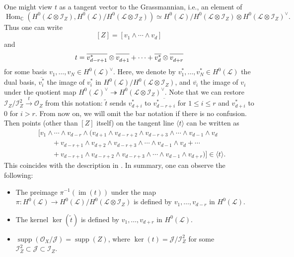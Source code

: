 \documentclass[a4paper]{amsart}
\numberwithin{equation}{section}
\theoremstyle{plain}
\theoremstyle{definition}
\theoremstyle{remark}
\numberwithin{figure}{section}
\numberwithin{table}{section}
\numberwithin{equation}{section}
\def \CC {\mathbb{C}}
\def \Ical {\mathcal{I}}
\def \Jcal {\mathcal{J}}
\def \Lcal {\mathcal{L}}
\def \Ocal {\mathcal{O}}
\DeclareMathOperator{\im}{im}
\DeclareMathOperator{\supp}{supp}
\DeclareMathOperator{\Hom}{Hom}
\begin{document}
One might view $t$ as a tangent vector to the Grassmannian, i.e., an element of
 \[
  \Hom_{\CC}(H^0(\Lcal \otimes \Ical_Z), H^0(\Lcal)/H^0(\Lcal \otimes \Ical_Z))
    \simeq H^0(\Lcal)/H^0(\Lcal \otimes \Ical_Z) \otimes H^0(\Lcal \otimes \Ical_Z)^{\vee}.
 \]
Thus one can write
 \[
  [Z] = [v_1 \wedge \cdots \wedge v_d]
 \]
and
 \begin{equation}
  t = \overline{v_{d-r+1}^{\ast}} \otimes \overline{v_{d+1}^{\vphantom{\ast}}} + \cdots + \overline{v_d^{\ast}} \otimes \overline{v_{d+r}^{\vphantom{\ast}}}
 \end{equation}
for some basis $v_1, \dots, v_N \in H^0(\Lcal)^{\vee}$.
Here, we denote by $v_1^{\ast}, \dots, v_N^{\ast} \in H^0(\Lcal)$ the dual basis, $\overline{v_i^{\ast}}$ the image of $v_i^{\ast}$ in $H^0(\Lcal)/H^0(\Lcal \otimes \Ical_Z)$, and $\overline{v_i}$ the image of $v_i$ under the quotient map $H^0(\Lcal)^{\vee} \twoheadrightarrow H^0(\Lcal \otimes \Ical_Z)^{\vee}$.
Note that we can restore $\Ical_Z/\Ical_Z^2 \xrightarrow{t} \Ocal_Z$ from this notation: $\widetilde{t}$ sends $v_{d+i}^{\ast}$ to $\overline{v_{d-r+i}^{\ast}}$ for $1 \leq i \leq r$ and $v_{d+i}^{\ast}$ to $0$ for $i > r$.
From now on, we will omit the bar notation if there is no confusion.
Then points (other than $[Z]$ itself) on the tangent line $\langle t \rangle$ can be written as
 \begin{equation} \label{eqn:points-in-tangent-line}
  \begin{split}
   &[v_1 \wedge \cdots \wedge v_{d-r} \wedge (v_{d+1} \wedge v_{d-r+2} \wedge v_{d-r+3} \wedge \cdots \wedge v_{d-1} \wedge v_{d} \\
   &\qquad + v_{d-r+1} \wedge v_{d+2} \wedge v_{d-r+3} \wedge \cdots \wedge v_{d-1} \wedge v_{d} + \cdots \\
   &\qquad + v_{d-r+1} \wedge v_{d-r+2} \wedge v_{d-r+3} \wedge \cdots \wedge v_{d-1} \wedge v_{d+r})] \in \langle t \rangle.
  \end{split}
 \end{equation}
This coincides with the description in \cite{GS2022}.
In summary, one can observe the following:
\begin{itemize}
    \item[\hypertarget{dagger1}{($\dagger_1$)}] The preimage $\pi^{-1}(\im(t))$ under the map $\pi:H^0(\Lcal) \rightarrow H^0(\Lcal)/H^0(\Lcal \otimes \Ical_Z)$ is defined by $v_1, \dots, v_{d-r}$ in $H^0(\Lcal)$.
    \item[\hypertarget{dagger2}{($\dagger_2$)}] The kernel $\ker(\widetilde{t})$ is defined by $v_1, \dots, v_{d+r}$ in $H^0(\Lcal)$.
    \item[\hypertarget{dagger3}{($\dagger_3$)}] $\supp(\Ocal_X/\Jcal) = \supp(Z)$, where $\ker(t) = \Jcal/\Ical_Z^2$ for some $\Ical_Z^2 \subset \Jcal \subset \Ical_Z$.
\end{itemize}
\end{document}
